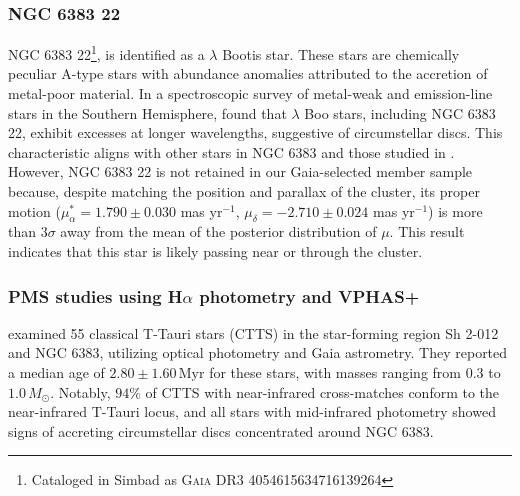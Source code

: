 \documentclass{aa}
\begin{document}
\subsubsection{NGC 6383 22}
NGC 6383 22\footnote{Cataloged in Simbad as \textsc{Gaia DR3 4054615634716139264}}, is identified as a $\lambda$ Bootis star. These stars are chemically peculiar A-type stars with abundance anomalies attributed to the accretion of metal-poor material. In a spectroscopic survey of metal-weak and emission-line stars in the Southern Hemisphere, \citet{2020MNRAS.499.2701M} found that $\lambda$ Boo stars, including NGC 6383 22, exhibit excesses at longer wavelengths, suggestive of circumstellar discs. This characteristic aligns with other stars in NGC 6383 and those studied in \citet{2019MNRAS.484.5102K}. However, NGC 6383 22 is not retained in our Gaia-selected member sample because, despite matching the position and parallax of the cluster, its proper motion ($\mu_\alpha^* = 1.790 \pm 0.030$ mas yr$^{-1}$, $\mu_\delta = -2.710 \pm 0.024$ mas yr$^{-1}$) is more than $3\sigma$ away from the mean of the posterior distribution of $\mu$. This result indicates that this star is likely passing near or through the cluster.

\subsubsection{PMS studies using \texorpdfstring{H$\alpha$}{H-alpha} photometry and VPHAS+}

\citet{2019MNRAS.484.5102K} examined 55 classical T-Tauri stars (CTTS) in the star-forming region Sh 2-012 and NGC 6383, utilizing optical photometry and Gaia astrometry. They reported a median age of $2.80 \pm 1.60\,\mathrm{Myr}$ for these stars, with masses ranging from $0.3$ to $1.0\,M_\odot$. Notably, $94\%$ of CTTS with near-infrared cross-matches conform to the near-infrared T-Tauri locus, and all stars with mid-infrared photometry showed signs of accreting circumstellar discs concentrated around NGC 6383.
\end{document}

